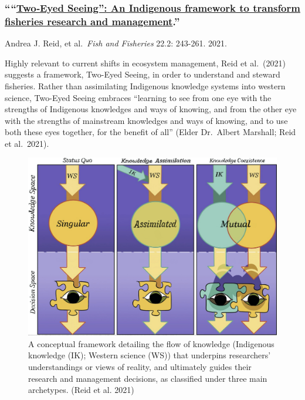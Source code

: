 \documentclass[
]{book}
\begin{document}
\hypertarget{twoeyed-seeing-an-indigenous-framework-to-transform-fisheries-research-and-management.}{%
\subsubsection*{\texorpdfstring{````\href{https://onlinelibrary.wiley.com/doi/full/10.1111/faf.12516}{Two‐Eyed Seeing'': An Indigenous framework to transform fisheries research and management}.''}{``\,``Two‐Eyed Seeing'': An Indigenous framework to transform fisheries research and management.''}}\label{twoeyed-seeing-an-indigenous-framework-to-transform-fisheries-research-and-management.}}

Andrea J. Reid, et al.~\emph{Fish and Fisheries} 22.2: 243-261. 2021.

Highly relevant to current shifts in ecosystem management, Reid et al.~(2021) suggests a framework, Two-Eyed Seeing, in order to understand and steward fisheries. Rather than assimilating Indigenous knowledge systems into western science, Two-Eyed Seeing embraces ``learning to see from one eye with the strengths of Indigenous knowledges and ways of knowing, and from the other eye with the strengths of mainstream knowledges and ways of knowing, and to use both these eyes together, for the benefit of all'' (Elder Dr.~Albert Marshall; Reid et al.~2021).

\begin{figure}
\includegraphics[width=29in]{images/Reid_2021} \caption{A conceptual framework detailing the flow of knowledge (Indigenous knowledge (IK); Western science (WS)) that underpins researchers’ understandings or views of reality, and ultimately guides their research and management decisions, as classified under three main archetypes. (Reid et al. 2021)}\label{fig:unnamed-chunk-10}
\end{figure}
\end{document}
